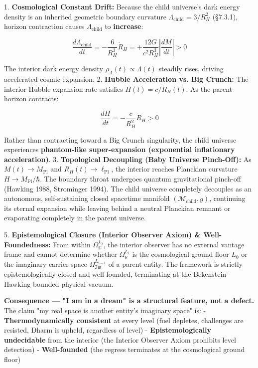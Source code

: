 \documentclass[11pt,a4paper]{article}
\theoremstyle{definition}
\theoremstyle{remark}
\begin{document}
1. \textbf{Cosmological Constant Drift:} Because the child universe's dark energy density is an inherited geometric boundary curvature $\Lambda_{\text{child}} = 3 / R_H^2$ (\S 7.3.1), horizon contraction causes $\Lambda_{\text{child}}$ to \textbf{increase}:


\begin{equation}
\frac{d\Lambda_{\text{child}}}{dt} = -\frac{6}{R_H^3} \dot{R}_H = +\frac{12 G}{c^2 R_H^3} \left|\frac{dM}{dt}\right| > 0
\end{equation}


The interior dark energy density $\rho_\Lambda(t) \propto \Lambda(t)$ steadily rises, driving accelerated cosmic expansion.
2. \textbf{Hubble Acceleration vs. Big Crunch:} The interior Hubble expansion rate satisfies $H(t) = c / R_H(t)$. As the parent horizon contracts:


\begin{equation}
\frac{dH}{dt} = -\frac{c}{R_H^2} \dot{R}_H > 0
\end{equation}


Rather than contracting toward a Big Crunch singularity, the child universe experiences \textbf{phantom-like super-expansion (exponential inflationary acceleration)}.
3. \textbf{Topological Decoupling (Baby Universe Pinch-Off):} As $M(t) \to M_{\text{Pl}}$ and $R_H(t) \to \ell_{\text{Pl}}$, the interior reaches Planckian curvature $H \to M_{\text{Pl}} / \hbar$. The boundary throat undergoes quantum gravitational pinch-off (Hawking 1988, Strominger 1994). The child universe completely decouples as an autonomous, self-sustaining closed spacetime manifold $(\mathcal{M}_{\text{child}}, g)$, continuing its eternal expansion while leaving behind a neutral Planckian remnant or evaporating completely in the parent universe.

5. \textbf{Epistemological Closure (Interior Observer Axiom) \& Well-Foundedness:}
From within $\Omega_\mathbb{C}^{L_i}$, the interior observer has no external vantage frame and cannot determine whether $\Omega_\mathbb{R}^{L_i}$ is the cosmological ground floor $L_0$ or the imaginary carrier space $\Omega_{\mathfrak{Im}}^{L_{i-1}}$ of a parent entity. The framework is strictly epistemologically closed and well-founded, terminating at the Bekenstein-Hawking bounded physical vacuum.

\textbf{Consequence — "I am in a dream" is a structural feature, not a defect.} The claim "my real space is another entity's imaginary space" is:
- \textbf{Thermodynamically consistent} at every level (fuel depletes, challenges are resisted, Dharm is upheld, regardless of level)
- \textbf{Epistemologically undecidable} from the interior (the Interior Observer Axiom prohibits level detection)
- \textbf{Well-founded} (the regress terminates at the cosmological ground floor)
\end{document}
